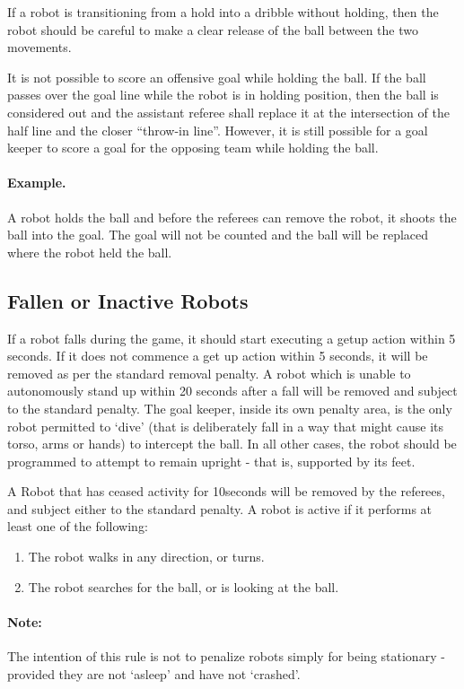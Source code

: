\documentclass[12pt]{article}
\begin{document}
If a robot is transitioning from a hold into a dribble without holding,
then the robot should be careful to make a clear release of the ball
between the two movements.

It is not possible to score an offensive goal while holding the ball.  If the ball passes over the goal line while the robot is in holding position, then the ball is considered out
and the assistant referee shall replace it at the intersection of the
half line and the closer ``throw-in line''. However, it is still possible for a goal keeper to score a goal for the opposing team
while holding the ball.

\paragraph{Example.} A robot holds the ball and before the referees
can remove the robot, it shoots the ball into the goal.  The goal
will not be counted and the ball will be replaced where the robot
held the ball.

\subsection{Fallen or Inactive Robots}
\label{sec:fallenrobots}

If a robot falls during the game, it should start executing a getup action within 5 seconds. If it does not commence a get up action within 5 seconds, it will be removed as per the standard removal penalty. A robot which is unable to autonomously stand up within 20 seconds after a fall will be removed and subject to the standard penalty. The goal keeper, inside its own penalty area, is the only robot permitted to `dive' (that is deliberately fall in a way that might cause its torso, arms or hands) to intercept the ball. In all other cases, the robot should be programmed to attempt to remain upright - that is, supported by its feet.

A Robot that has ceased activity for 10seconds will be removed by the referees, and subject either to the standard penalty. A robot is active if it performs at least one of the following:
\begin{enumerate}
  \item {The robot walks in any direction, or turns.}
  \item {The robot searches for the ball, or is looking at the ball.}
\end{enumerate}

\paragraph{Note:} The intention of this rule is not to penalize robots simply for being stationary - provided they are not `asleep' and have not `crashed'.
\end{document}
